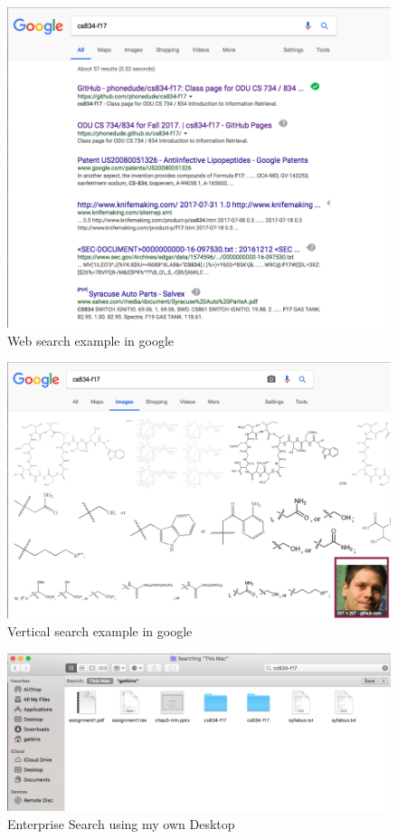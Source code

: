 \documentclass[letterpaper,11pt]{article}
\begin{document}
  \begin{figure}[h]
  \centering
  \includegraphics[scale=0.4]{websearch.png}
  \caption{Web search example in google}
  \label{fig:websearch}
  \end{figure}
  
   \begin{figure}[h]
  \centering
  \includegraphics[scale=0.4]{verticalsearch.png}
  \caption{Vertical search example in google}
  \label{fig:verticalsearch}
  \end{figure}
  
   \clearpage
  \begin{figure}[h]
  \centering
  \includegraphics[scale=0.4]{filesystemsearch.png}
  \caption{Enterprise Search using my own Desktop}
  \label{fig:esearch1}
  \end{figure}
\end{document}

